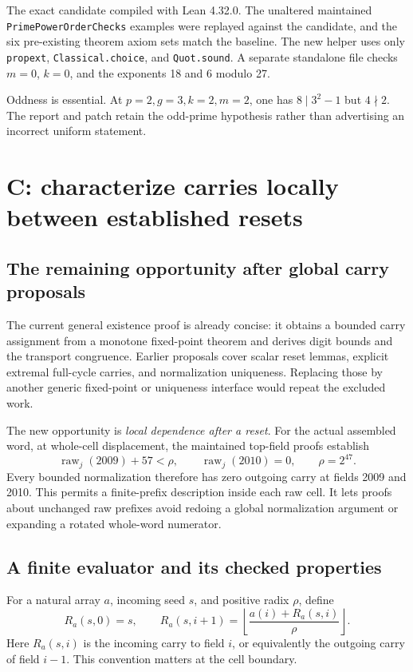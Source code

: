 \documentclass[11pt]{article}
\newcommand{\code}[1]{\nolinkurl{#1}}
\begin{document}
The exact candidate compiled with Lean 4.32.0. The unaltered maintained
\code{PrimePowerOrderChecks} examples were replayed against the candidate, and
the six pre-existing theorem axiom sets match the baseline. The new helper uses
only \code{propext}, \code{Classical.choice}, and \code{Quot.sound}. A separate
standalone file checks \(m=0\), \(k=0\), and the exponents 18 and 6 modulo 27.

Oddness is essential. At \(p=2,g=3,k=2,m=2\), one has
\(8\mid3^2-1\) but \(4\nmid2\). The report and patch retain the odd-prime
hypothesis rather than advertising an incorrect uniform statement.

\section{C: characterize carries locally between established resets}
\subsection{The remaining opportunity after global carry proposals}
The current general existence proof is already concise: it obtains a bounded
carry assignment from a monotone fixed-point theorem and derives digit bounds
and the transport congruence. Earlier proposals cover scalar reset lemmas,
explicit extremal full-cycle carries, and normalization uniqueness. Replacing
those by another generic fixed-point or uniqueness interface would repeat the
excluded work.\cite{carry,carryconstruction}

The new opportunity is \emph{local dependence after a reset}. For the actual
assembled word, at whole-cell displacement, the maintained top-field proofs
establish
\[
 \operatorname{raw}_j(2009)+57<\rho,\qquad
 \operatorname{raw}_j(2010)=0,\qquad \rho=2^{47}.
\]
Every bounded normalization therefore has zero outgoing carry at fields 2009
and 2010.\cite{topbounds}
This permits a finite-prefix description inside each raw cell. It lets proofs
about unchanged raw prefixes avoid redoing a global normalization argument or
expanding a rotated whole-word numerator.

\subsection{A finite evaluator and its checked properties}
For a natural array \(a\), incoming seed \(s\), and positive radix \(\rho\),
define
\[
 R_a(s,0)=s,\qquad
 R_a(s,i+1)=\left\lfloor\frac{a(i)+R_a(s,i)}{\rho}\right\rfloor.
\]
Here \(R_a(s,i)\) is the incoming carry to field \(i\), or equivalently the
outgoing carry of field \(i-1\). This convention matters at the cell boundary.
\end{document}
